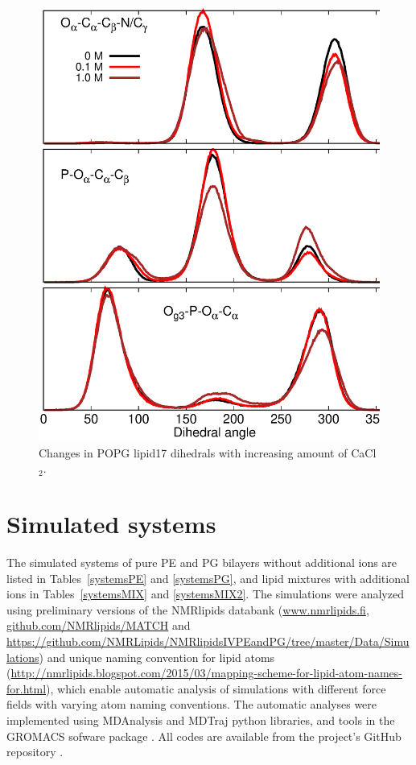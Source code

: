 \documentclass[journal=jpcbfk]{achemso}
\begin{document}
\begin{figure}[]
  \centering
  \includegraphics[width=16.0cm]{./Figs/DIHEDRALSlipid17WITHCaClPOPG.eps}
  \caption{\label{DIHSwithCAlipid17POPG}
    Changes in POPG lipid17 dihedrals with increasing amount of CaCl$_2$.
  }
\end{figure}


\clearpage
\section{Simulated systems}

The simulated systems of pure PE and PG bilayers without additional ions
are listed in Tables~\ref{systemsPE} and \ref{systemsPG},
and lipid mixtures with additional ions in Tables~\ref{systemsMIX} and \ref{systemsMIX2}.
The simulations were analyzed using preliminary versions of the NMRlipids databank
(\url{www.nmrlipids.fi}, \url{github.com/NMRlipids/MATCH} and \url{https://github.com/NMRLipids/NMRlipidsIVPEandPG/tree/master/Data/Simulations})
and unique naming convention for lipid atoms (\url{http://nmrlipids.blogspot.com/2015/03/mapping-scheme-for-lipid-atom-names-for.html}),
which enable automatic analysis of simulations with different force fields with varying atom naming conventions.
The automatic analyses were implemented using MDAnalysis \cite{agrawal11,gowers16} and MDTraj \cite{mcgibbon15}
python libraries, and tools in the GROMACS sofware package \cite{gromacsMANUAL}.
All codes are available from the project's GitHub repository \cite{NMRlipidsIVbgit}.
\end{document}
